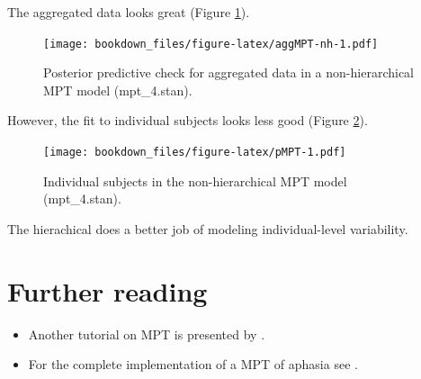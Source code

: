 \documentclass[12pt,]{krantz}
\newenvironment{Shaded}{\begin{snugshade}}{\end{snugshade}}
\newcommand{\DataTypeTok}[1]{\textcolor[rgb]{0.13,0.29,0.53}{#1}}
\newcommand{\KeywordTok}[1]{\textcolor[rgb]{0.13,0.29,0.53}{\textbf{#1}}}
\newcommand{\NormalTok}[1]{#1}
\newcommand{\OperatorTok}[1]{\textcolor[rgb]{0.81,0.36,0.00}{\textbf{#1}}}
\newcommand{\StringTok}[1]{\textcolor[rgb]{0.31,0.60,0.02}{#1}}
\providecommand{\tightlist}{%
  \setlength{\itemsep}{0pt}\setlength{\parskip}{0pt}}
\theoremstyle{definition}
\theoremstyle{definition}
\theoremstyle{definition}
\theoremstyle{remark}
\begin{document}
The aggregated data looks great (Figure \ref{fig:aggMPT-nh}).

\begin{Shaded}
\end{Shaded}

\begin{figure}
\centering
\texttt{[image: bookdown\_files/figure-latex/aggMPT-nh-1.pdf]}
\caption{\label{fig:aggMPT-nh}Posterior predictive check for aggregated data in a non-hierarchical MPT model (mpt\_4.stan).}
\end{figure}

However, the fit to individual subjects looks less good (Figure \ref{fig:pMPT}).

\begin{Shaded}
\end{Shaded}

\begin{figure}
\centering
\texttt{[image: bookdown\_files/figure-latex/pMPT-1.pdf]}
\caption{\label{fig:pMPT}Individual subjects in the non-hierarchical MPT model (mpt\_4.stan).}
\end{figure}

The hierachical does a better job of modeling individual-level variability.

\hypertarget{further-reading-11}{%
\section{Further reading}\label{further-reading-11}}

\begin{itemize}
\tightlist
\item
  Another tutorial on MPT is presented by \citet{matzkeBayesianEstimationMultinomial2015}.
\item
  For the complete implementation of a MPT of aphasia see \citet{WalkerEtAl2018}.
\end{itemize}
\end{document}
